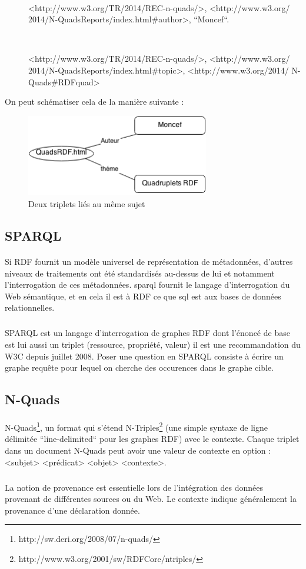 \documentclass[12pt,a4]{report}
\begin{document}
\begin{description}
\item[\ \ \textbullet]  <http://www.w3.org/TR/2014/REC-n-quads/>, <http://www.w3.org/
2014/N-QuadsReports/index.html\#author>, ``Moncef``.
\item[\ \ \textbullet]  <http://www.w3.org/TR/2014/REC-n-quads/>, <http://www.w3.org/
2014/N-QuadsReports/index.html\#topic>, <http://www.w3.org/2014/
N-Quads\#RDFquad>
\end{description}
On peut schématiser cela de la manière suivante :
\begin{figure}[H]
\centering
\centering
\includegraphics[width=8cm]{Diag.png}
\caption{Deux triplets liés au même sujet}
\end{figure}
\newpage
\subsection{SPARQL}
\paragraph{}
Si RDF fournit un modèle universel de représentation de métadonnées, d'autres niveaux de traitements ont été standardisés au-dessus de lui et notamment l'interrogation de ces métadonnées. 
\gls{sparql} fournit le langage d'interrogation du Web sémantique, et en cela il est à RDF ce que \gls{sql} est aux bases de données relationnelles.
\subparagraph{}
SPARQL est un langage d'interrogation de graphes RDF dont l'énoncé de base est lui aussi un triplet (ressource, propriété, valeur) il est une recommandation du W3C depuis juillet 2008.
Poser une question en SPARQL consiste à écrire un graphe requête pour lequel on cherche des occurences dans le graphe cible.
\subsection{N-Quads}
\paragraph{}
N-Quads\footnote{http://sw.deri.org/2008/07/n-quads/}, un format qui s'étend N-Triples\footnote{http://www.w3.org/2001/sw/RDFCore/ntriples/} (une simple syntaxe de ligne délimitée ``line-delimited`` pour les graphes RDF) avec le contexte. Chaque triplet dans un document N-Quads peut avoir une valeur de contexte en option :
<subjet> <prédicat> <objet> <contexte>.
\subparagraph{}
La notion de provenance est essentielle lors de l'intégration des données provenant de différentes sources ou du Web. Le contexte indique généralement la provenance d'une déclaration donnée.
\end{document}
